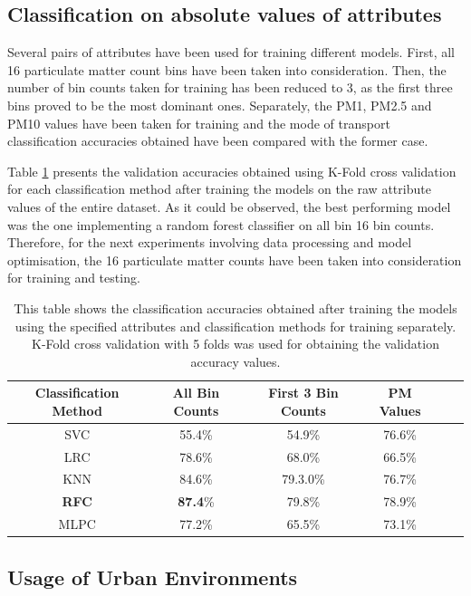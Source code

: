 \documentclass[bsc,frontabs,twoside,singlespacing, parskip,deptreport]{infthesis}     %
\begin{document}
\subsection{Classification on absolute values of attributes}
\label{subsec:abs-values-models}

Several pairs of attributes have been used for training different models. First, all 16 particulate matter count bins have been taken into consideration. Then, the number of bin counts taken for training has been reduced to 3, as the first three bins proved to be the most dominant ones. Separately, the PM1, PM2.5 and PM10 values have been taken for training and the mode of transport classification accuracies obtained have been compared with the former case. 

Table \ref{table:abs-values-models} presents the validation accuracies obtained using K-Fold cross validation for each classification method after training the models on the raw attribute values of the entire dataset. As it could be observed, the best performing model was the one implementing a random forest classifier on all bin 16 bin counts. Therefore, for the next experiments involving data processing and model optimisation, the 16 particulate matter counts have been taken into consideration for training and testing.

\begin{table}[h!]
\centering
 \begin{tabular}{||c | c | c | c | c | c||} 
 \hline
 Classification Method & All Bin Counts & First 3 Bin Counts & PM Values \\ [0.5ex] 
 \hline\hline
 SVC & 55.4\% & 54.9\% & 76.6\% \\ 
 \hline
 LRC & 78.6\% & 68.0\% & 66.5\% \\
 \hline
 KNN & 84.6\% & 79.3.0\% & 76.7\% \\ 
 \hline
 \textbf{RFC} & \textbf{87.4}\% & 79.8\% & 78.9\% \\ 
 \hline
  MLPC & 77.2\% & 65.5\% & 73.1\% \\ 
 \hline
\end{tabular}
\caption{This table shows the classification accuracies obtained after training the models using the specified attributes and classification methods for training separately. K-Fold cross validation with 5 folds was used for obtaining the validation accuracy values.}
\label{table:abs-values-models}
\end{table}


\subsection{Usage of Urban Environments}
\label{subsec:results-urban-env-use}
\end{document}
